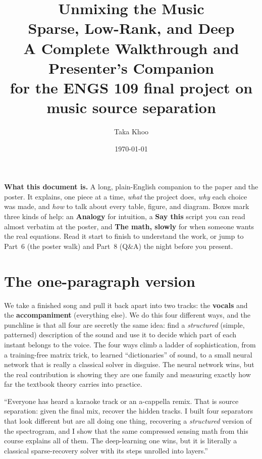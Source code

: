 \documentclass[11pt]{article}
\title{\vspace{-1.5em}\textbf{\color{dgreen}Unmixing the Music}\\[0.2em]
\large Sparse, Low-Rank, and Deep\\[0.5em]
\large A Complete Walkthrough and Presenter's Companion\\[0.6em]
\normalsize for the ENGS 109 final project on music source separation}
\author{Taka Khoo}
\date{\today}
\begin{document}
\maketitle
\thispagestyle{fancy}

\begin{keypoint}
\textbf{What this document is.} A long, plain-English companion to the paper and
the poster. It explains, one piece at a time, \emph{what} the project does,
\emph{why} each choice was made, and \emph{how} to talk about every table,
figure, and diagram. Boxes mark three kinds of help: an \textcolor{accent}{\textbf{Analogy}}
for intuition, a \textcolor{dgreen}{\textbf{Say this}} script you can read almost
verbatim at the poster, and \textcolor{purpleA}{\textbf{The math, slowly}} for when
someone wants the real equations. Read it start to finish to understand the work,
or jump to Part~6 (the poster walk) and Part~8 (Q\&A) the night before you present.
\end{keypoint}

\tableofcontents

\section{The one-paragraph version}
We take a finished song and pull it back apart into two tracks: the
\textbf{vocals} and the \textbf{accompaniment} (everything else). We do this four
different ways, and the punchline is that all four are secretly the same idea:
find a \emph{structured} (simple, patterned) description of the sound and use it to
decide which part of each instant belongs to the voice. The four ways climb a
ladder of sophistication, from a training-free matrix trick, to learned
``dictionaries'' of sound, to a small neural network that is really a classical
solver in disguise. The neural network wins, but the real contribution is showing
they are one family and measuring exactly how far the textbook theory carries into
practice.

\begin{saythis}
``Everyone has heard a karaoke track or an a-cappella remix. That is source
separation: given the final mix, recover the hidden tracks. I built four
separators that look different but are all doing one thing, recovering a
\emph{structured} version of the spectrogram, and I show that the same compressed
sensing math from this course explains all of them. The deep-learning one wins,
but it is literally a classical sparse-recovery solver with its steps unrolled
into layers.''
\end{saythis}
\end{document}
